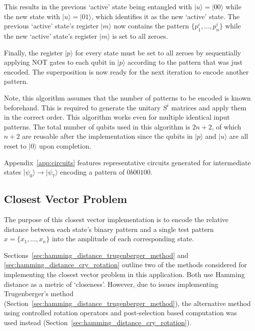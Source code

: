 \noindent This results in the previous `active' state being entangled with $\vert u \rangle = \vert 00 \rangle$ while the new state with $\vert u \rangle = \vert 01 \rangle$, which identifies it as the new `active' state. The previous `active' state's register $\vert m \rangle$ now contains the pattern $\{ p_1^i, \dots, p_n^i \}$ while the new `active' state's register $\vert m \rangle$ is set to all zeroes. 

Finally, the register $\vert p \rangle$ for every state must be set to all zeroes by sequentially applying \textrm{NOT} gates to each qubit in $\vert p \rangle$ according to the pattern that was just encoded. The superposition is now ready for the next iteration to encode another pattern. 

Note, this algorithm assumes that the number of patterns to be encoded is known beforehand. This is required to generate the unitary $S^i$ matrices and apply them in the correct order. This algorithm works even for multiple identical input patterns. The total number of qubits used in this algorithm is $2n+2$, of which $n+2$ are reusable after the implementation since the qubits in $\vert p \rangle$ and $\vert u \rangle$ are all reset to $\vert 0\rangle$ upon completion.

Appendix~\ref{app:circuits} features representative circuits generated for intermediate states $\vert \psi_{0}\rangle \rightarrow \vert \psi_{7}\rangle$ encoding a pattern of $0b00100$.

\subsection{Closest Vector Problem}
\label{sec:closest_vector_problem}
The purpose of this closest vector implementation is to encode the relative distance between each state's binary pattern and a single test pattern $x = \{x_1,\dots, x_n\}$ into the amplitude of each corresponding state.

Sections~\ref{sec:hamming_distance_trugenberger_method} and \ref{sec:hamming_distance_cry_rotation} outline two of the methods considered for implementing the closest vector problem in this application. Both use Hamming distance as a metric of `closeness'. However, due to issues implementing Trugenberger's method (Section~\ref{sec:hamming_distance_trugenberger_method}), the alternative method using controlled rotation operators and post-selection based computation was used instead (Section~\ref{sec:hamming_distance_cry_rotation}).


